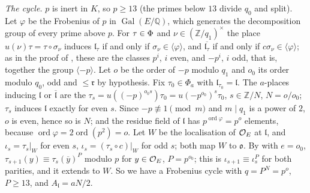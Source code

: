 \documentclass[10pt]{amsart}
\theoremstyle{definition}
\theoremstyle{remark}
\newcommand{\Z}{\mathbb Z}
\newcommand{\Q}{\mathbb Q}
\providecommand{\auPa}{\Phi_a}
\providecommand{\aubar}[1]{\overline{#1}}
\providecommand{\pao}{\mathfrak o}
\begin{document}
\emph{The cycle.} $p$ is inert in $K$, so $p\ge13$ (the primes below $13$ divide $q_0$ and split).
Let $\varphi$ be the Frobenius of $p$ in $\operatorname{Gal}(E/\Q)$, which generates the
decomposition group of every prime above $p$. For $\tau\in\Phi$ and $\nu\in(\Z/q_1)^\times$ the
place $u(\nu)\tau=\tau\circ\sigma_\nu$ induces $\mathfrak l_\tau$ if and only if $\sigma_\nu\in
\langle\varphi\rangle$, and $\aubar{\mathfrak l_\tau}$ if and only if $c\sigma_\nu\in\langle
\varphi\rangle$; as in the proof of {\cite[Lemma~4.17]{P49}}, these are the classes $p^{i}$, $i$ even,
and $-p^{i}$, $i$ odd, that is, together the group $\langle-p\rangle$. Let $o$ be the order of
$-p$ modulo $q_1$ and $o_0$ its order modulo $q_0$, odd and $\le\mathfrak r$ by hypothesis. Fix
$\tau_0\in\auPa$ with $\mathfrak l_{\tau_0}=\mathfrak l$. The $a$-places inducing $\mathfrak l$ or
$\aubar{\mathfrak l}$ are the $\tau_s=u((-p)^{o_0s})\tau_0=u(-p^{o_0})^s\tau_0$, $s\in\Z/N$,
$N=o/o_0$; $\tau_s$ induces $\mathfrak l$ exactly for even $s$. Since $-p\not\equiv1\pmod m$ and
$m\mid q_1$ is a power of $2$, $o$ is even, hence so is $N$; and the residue field of $\mathfrak
l$ has $p^{\operatorname{ord}\varphi}=p^{o}$ elements, because $\operatorname{ord}\varphi=2
\operatorname{ord}(p^2)=o$. Let $W$ be the localisation of $\mathcal O_E$ at $\mathfrak l$, and
$\iota_s=\tau_s|_W$ for even $s$, $\iota_s=(\tau_s\circ c)|_W$ for odd $s$; both map $W$ to
$\pao$. By {\cite[Lemma~4.11]{P49}} with $e=o_0$, $\tau_{s+1}(y)\equiv\tau_s(\aubar y)^{P}$ modulo
$p$ for $y\in\mathcal O_E$, $P=p^{o_0}$; this is $\iota_{s+1}\equiv\iota_s^P$ for both parities, and it
extends to $W$. So we have a Frobenius cycle with $q=P^N=p^o$, $P\ge13$, and $A_{\mathfrak
l}=aN/2$.
\end{document}
